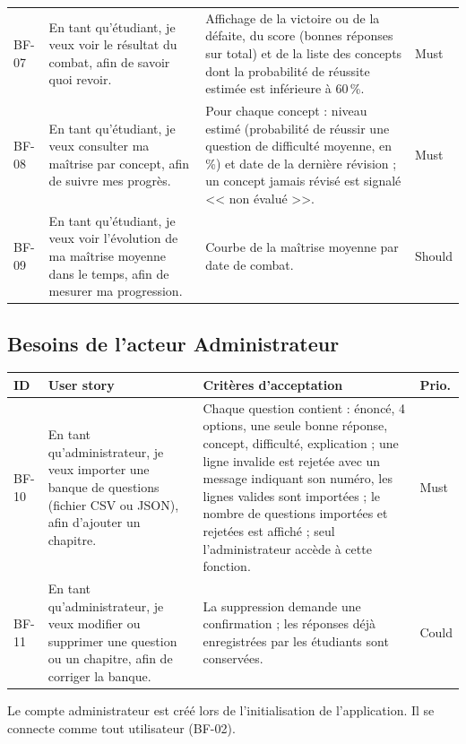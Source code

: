 \documentclass[11pt,a4paper]{article}
\begin{document}
{\begin{longtable}{L{1.2cm}L{5.0cm}L{6.6cm}L{1.4cm}}
\addlinespace
BF-07 & En tant qu'\'etudiant, je veux voir le r\'esultat du combat, afin de savoir quoi revoir. & Affichage de la victoire ou de la d\'efaite, du score (bonnes r\'eponses sur total) et de la liste des concepts dont la probabilit\'e de r\'eussite estim\'ee est inf\'erieure \`a 60\,\%. & Must\\
\addlinespace
BF-08 & En tant qu'\'etudiant, je veux consulter ma ma\^itrise par concept, afin de suivre mes progr\`es. & Pour chaque concept : niveau estim\'e (probabilit\'e de r\'eussir une question de difficult\'e moyenne, en \%) et date de la derni\`ere r\'evision ; un concept jamais r\'evis\'e est signal\'e << non \'evalu\'e >>. & Must\\
\addlinespace
BF-09 & En tant qu'\'etudiant, je veux voir l'\'evolution de ma ma\^itrise moyenne dans le temps, afin de mesurer ma progression. & Courbe de la ma\^itrise moyenne par date de combat. & Should\\
\bottomrule
\end{longtable}
}

\subsection{Besoins de l'acteur Administrateur}
{\small
\begin{longtable}{L{1.2cm}L{5.0cm}L{6.6cm}L{1.4cm}}
\toprule
\textbf{ID} & \textbf{User story} & \textbf{Crit\`eres d'acceptation} & \textbf{Prio.}\\
\midrule
\endhead
BF-10 & En tant qu'administrateur, je veux importer une banque de questions (fichier CSV ou JSON), afin d'ajouter un chapitre. & Chaque question contient : \'enonc\'e, 4 options, une seule bonne r\'eponse, concept, difficult\'e, explication ; une ligne invalide est rejet\'ee avec un message indiquant son num\'ero, les lignes valides sont import\'ees ; le nombre de questions import\'ees et rejet\'ees est affich\'e ; seul l'administrateur acc\`ede \`a cette fonction. & Must\\
\addlinespace
BF-11 & En tant qu'administrateur, je veux modifier ou supprimer une question ou un chapitre, afin de corriger la banque. & La suppression demande une confirmation ; les r\'eponses d\'ej\`a enregistr\'ees par les \'etudiants sont conserv\'ees. & Could\\
\bottomrule
\end{longtable}
}
Le compte administrateur est cr\'e\'e lors de l'initialisation de l'application. Il se connecte comme tout utilisateur (BF-02).
\end{document}
